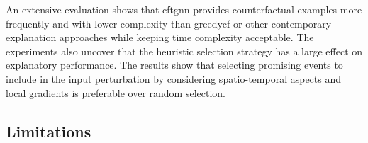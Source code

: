 An extensive evaluation shows that \gls{cftgnn} provides counterfactual examples more frequently and with lower complexity than \gls{greedycf} or other contemporary explanation approaches while keeping time complexity acceptable. The experiments also uncover that the heuristic selection strategy has a large effect on explanatory performance. The results show that selecting promising events to include in the input perturbation by considering spatio-temporal aspects and local gradients is preferable over random selection.



\subsection{Limitations}
\label{s_Conclusion_Limitations}

